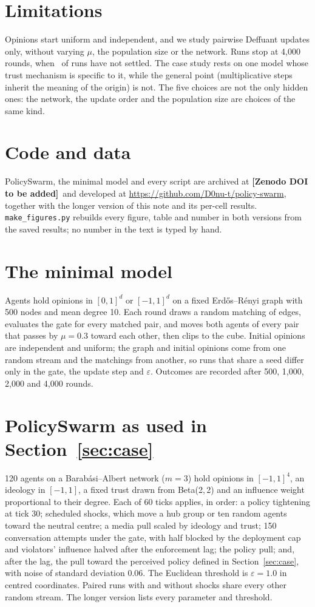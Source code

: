 \documentclass[11pt]{article}
\newcommand{\ArchiveDOI}{\textbf{[Zenodo DOI to be added]}}
\begin{document}
\section{Limitations}
Opinions start uniform and independent, and we study pairwise Deffuant updates only, without varying $\mu$, the population size or the network.
Runs stop at 4{,}000 rounds, when \VUnsettledFourAll\ of runs have not settled.
The case study rests on one model whose trust mechanism is specific to it, while the general point (multiplicative steps inherit the meaning of the origin) is not.
The five choices are not the only hidden ones: the network, the update order and the population size are choices of the same kind.

\section*{Code and data}
PolicySwarm, the minimal model and every script are archived at \ArchiveDOI\ and developed at \url{https://github.com/D0nu-t/policy-swarm}, together with the longer version of this note and its per-cell results.
\texttt{make\_figures.py} rebuilds every figure, table and number in both versions from the saved results; no number in the text is typed by hand.




\appendix
\section{The minimal model}
\label{app:odd}
Agents hold opinions in $[0,1]^d$ or $[-1,1]^d$ on a fixed Erd\H{o}s--R\'enyi graph with 500 nodes and mean degree 10. Each round draws a random matching of edges, evaluates the gate for every matched pair, and moves both agents of every pair that passes by $\mu = 0.3$ toward each other, then clips to the cube. Initial opinions are independent and uniform; the graph and initial opinions come from one random stream and the matchings from another, so runs that share a seed differ only in the gate, the update step and $\varepsilon$. Outcomes are recorded after 500, 1{,}000, 2{,}000 and 4{,}000 rounds.

\section{PolicySwarm as used in Section~\ref{sec:case}}
\label{app:policyswarm}
120 agents on a Barab\'asi--Albert network ($m=3$) hold opinions in $[-1,1]^4$, an ideology in $[-1,1]$, a fixed trust drawn from Beta(2,\,2) and an influence weight proportional to their degree. Each of 60 ticks applies, in order: a policy tightening at tick 30; scheduled shocks, which move a hub group or ten random agents toward the neutral centre; a media pull scaled by ideology and trust; 150 conversation attempts under the gate, with half blocked by the deployment cap and violators' influence halved after the enforcement lag; the policy pull; and, after the lag, the pull toward the perceived policy defined in Section~\ref{sec:case}, with noise of standard deviation 0.06. The Euclidean threshold is $\varepsilon = 1.0$ in centred coordinates. Paired runs with and without shocks share every other random stream. The longer version lists every parameter and threshold.
\end{document}
